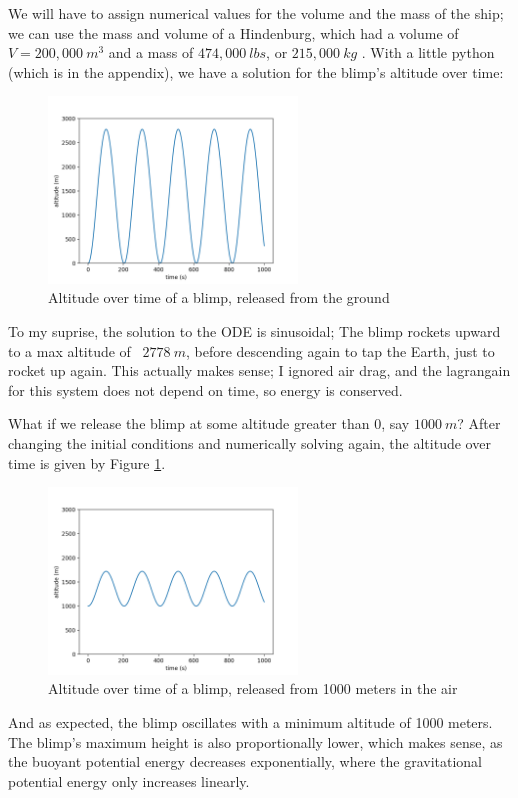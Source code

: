 \documentclass[titlepage]{article}
\begin{document}
\newpage

We will have to assign numerical values for the volume and the mass of the ship; we can use the mass and volume of a Hindenburg, which had a volume of $V = 200,000~m^3$ and a mass of $474,000~lbs$, or $215,000~kg$ \cite{zeppelin}. With a little python (which is in the appendix), we have a solution for the blimp's altitude over time:
\begin{figure}[h]
    \centering
    \includegraphics[width=250px]{p1_0m_release.png}
    \caption{Altitude over time of a blimp, released from the ground}
\end{figure}
To my suprise, the solution to the ODE is sinusoidal; The blimp rockets upward to a max altitude of ~$2778~m$, before descending again to tap the Earth, just to rocket up again. This actually makes sense; I ignored air drag, and the lagrangain for this system does not depend on time, so energy is conserved.

\newpage
What if we release the blimp at some altitude greater than 0, say $1000~m$? After changing the initial conditions and numerically solving again, the altitude over time is given by Figure \ref{fig:1000mrelease}.
\begin{figure}[h!]
    \centering
    \includegraphics[width=250px]{p1_1000m_release.png}
    \caption{Altitude over time of a blimp, released from 1000 meters in the air}
    \label{fig:1000mrelease}
\end{figure}
And as expected, the blimp oscillates with a minimum altitude of 1000 meters. The blimp's maximum height is also proportionally lower, which makes sense, as the buoyant potential energy decreases exponentially, where the gravitational potential energy only increases linearly.
\vspace{8pt}
\end{document}
